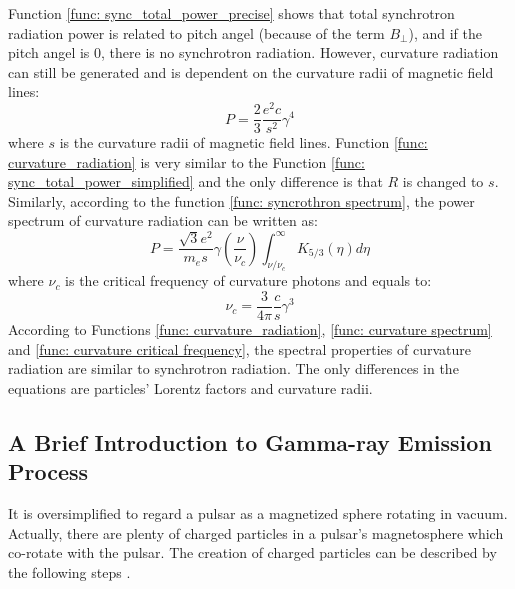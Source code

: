 \documentclass[12pt]{report}
\begin{document}
          Function \ref{func: sync_total_power_precise} shows that total synchrotron radiation power 
          is related to pitch angel (because of the term $B_\perp$), and if the pitch angel is $0$, there is 
          no synchrotron radiation. However, curvature radiation can still be generated and is dependent on 
          the curvature radii of magnetic field lines:
          \begin{equation}
            \label{func: curvature_radiation}
            P = \frac{2}{3}\frac{e^2c}{s^2}\gamma^4
          \end{equation}
          where $s$ is the curvature radii of magnetic field lines. 
          Function \ref{func: curvature_radiation} is very similar to the Function 
          \ref{func: sync_total_power_simplified} and the only difference is that $R$ is changed to $s$.
          Similarly, according to the function \ref{func: syncrothron spectrum}, 
          the power spectrum of curvature radiation can be written as:
          \begin{equation}
            \label{func: curvature spectrum}
            P = \frac{\sqrt{3}e^2}{m_es}\gamma \left(\frac{\nu}{\nu_c}\right) \int_{\nu / \nu_c}^{\infty} K_{5/3}\left(\eta \right)d\eta
          \end{equation}
          where $\nu_c$ is the critical frequency of curvature photons and equals to:
          \begin{equation}
            \label{func: curvature critical frequency}
            \nu_c = \frac{3}{4\pi}\frac{c}{s}\gamma^3
          \end{equation}
          According to Functions \ref{func: curvature_radiation}, \ref{func: curvature spectrum} and 
          \ref{func: curvature critical frequency}, the spectral properties of curvature radiation are  
          similar to synchrotron radiation. The only differences in the equations are particles' Lorentz 
          factors and curvature radii. 

        \subsection{A Brief Introduction to Gamma-ray Emission Process}
          It is oversimplified to regard a pulsar as a magnetized sphere rotating in vacuum. Actually,
          there are plenty of 
          charged particles in a pulsar's magnetosphere which co-rotate with the pulsar. The creation of 
          charged particles can 
          be described by the following steps \cite{Sturrock:1971zc}.
\end{document}
